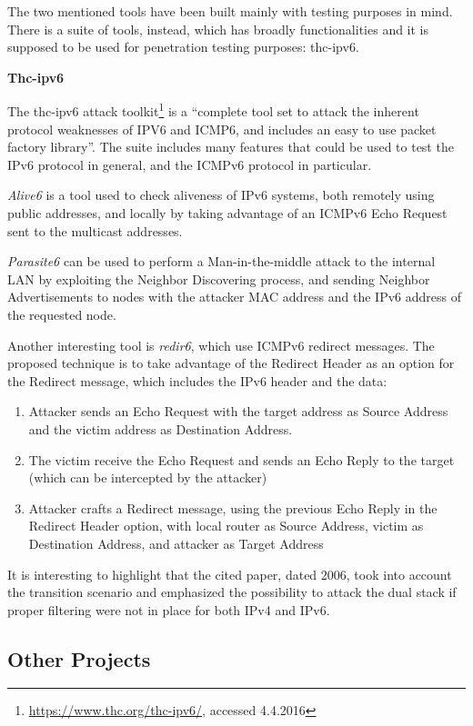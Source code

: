 \documentclass[12pt]{article}
\begin{document}
The two mentioned tools have been built mainly with testing purposes in mind. There is a suite of tools, instead, which has broadly functionalities and it is supposed to be used for penetration testing purposes: thc-ipv6.

\textbf{Thc-ipv6}

The thc-ipv6 attack toolkit\footnote{\url{https://www.thc.org/thc-ipv6/}, accessed 4.4.2016} is a ``complete tool set to attack the inherent protocol weaknesses of IPV6 and ICMP6, and includes an easy to use packet factory library''. The suite includes many features that could be used to test the IPv6 protocol in general, and the ICMPv6 protocol in particular\cite{thc}.

\textit{Alive6} is a tool used to check aliveness of IPv6 systems, both remotely using public addresses, and locally by taking advantage of an ICMPv6 Echo Request sent to the multicast addresses\cite{thc}.

\textit{Parasite6} can be used to perform a Man-in-the-middle attack to the internal LAN by exploiting the Neighbor Discovering process, and sending Neighbor Advertisements to nodes with the attacker MAC address and the IPv6 address of the requested node\cite{thc}.

Another interesting tool is \textit{redir6}, which use ICMPv6 redirect messages. The proposed technique is to take advantage of the Redirect Header as an option for the Redirect message, which includes the IPv6 header and the data\cite{thc}:
\vspace{-15pt}
\begin{enumerate}[noitemsep,topsep=0pt,partopsep=0pt]
 \item Attacker sends an Echo Request with the target address as Source Address and the victim address as Destination Address.
 \item The victim receive the Echo Request and sends an Echo Reply to the target (which can be intercepted by the attacker)
 \item Attacker crafts a Redirect message, using the previous Echo Reply in the Redirect Header option, with local router as Source Address, victim as Destination Address, and attacker as Target Address
\end{enumerate}
It is interesting to highlight that the cited paper, dated 2006, took into account the transition scenario and emphasized the possibility to attack the dual stack if proper filtering were not in place for both IPv4 and IPv6.


\subsection{Other Projects}
\label{sub:otherProj}
\end{document}
